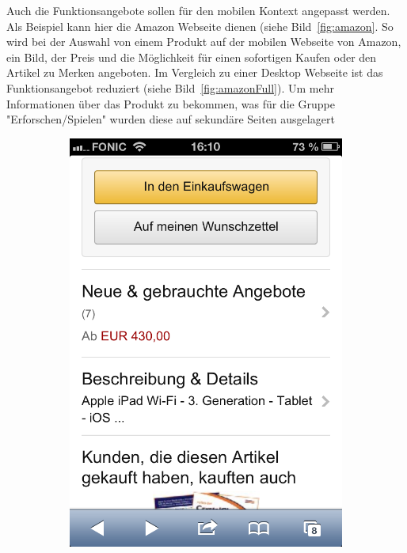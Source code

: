 Auch die Funktionsangebote sollen für den mobilen Kontext angepasst werden. Als Beispiel kann hier die Amazon Webseite dienen (siehe Bild~\ref{fig:amazon}. So wird bei der Auswahl von einem Produkt auf der mobilen Webseite von Amazon, ein Bild, der Preis und die Möglichkeit für einen sofortigen Kaufen oder den Artikel zu Merken angeboten. Im Vergleich zu einer Desktop Webseite ist das  Funktionsangebot reduziert (siehe Bild~\ref{fig:amazonFull}). Um mehr Informationen über das Produkt zu bekommen, was für die Gruppe "Erforschen/Spielen" wurden diese auf sekundäre Seiten ausgelagert

\begin{figure}
	\centering
	\begin{subfigure}[b]{0.3\textwidth}
		\centering
		\includegraphics[width=1\textwidth]{img/amazon.png}

\end{subfigure}
\end{figure}
